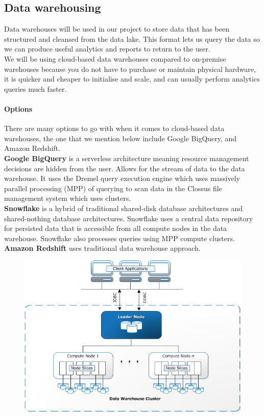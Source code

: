 \documentclass[10pt]{article}
\begin{document}
\subsection{Data warehousing}
Data warehouses will be used in our project to store data that has been structured and cleansed from the data lake. This format lets us query the data so we can produce useful analytics and reports to return to the user.
\\
We will be using cloud-based data warehouses compared to on-premise warehouses because you do not have to purchase or maintain physical hardware, it is quicker and cheaper to initialise and scale, and can usually perform analytics queries much faster.
\paragraph{Options}There are many options to go with when it comes to cloud-based data warehouses, the one that we mention below include Google BigQuery, and Amazon Redshift.\cite{data-warehouse-comparisons}\\
\textbf{Google BigQuery} is a serverless architecture meaning resource management decisions are hidden from the user. Allows for the stream of data to the data warehouse. It uses the Dremel query execution engine which uses massively parallel processing (MPP) of querying to scan data in the Clossus file management system which uses clusters.\\
\textbf{Snowflake} is a hybrid of traditional shared-disk database architectures and shared-nothing database architectures. Snowflake uses a central data repository for persisted data that is accessible from all compute nodes in the data warehouse. Snowflake also processes queries using MPP compute clusters. \\
\textbf{Amazon Redshift}\cite{redshift-architecture} uses traditional data warehouse approach.\\
\begin{figure}[h!]
   	\centering
   	\includegraphics[width=0.7\linewidth]{images/Redshift-Architecture.png}	
   \end{figure}
\end{document}
